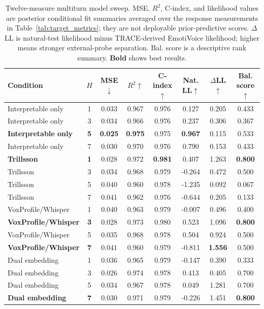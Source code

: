 \documentclass[conference]{IEEEtran}
\begin{document}
\begin{table}[t]
\centering
\caption{Twelve-measure multiturn model sweep. MSE, $R^2$, C-index, and likelihood values are posterior conditional fit summaries averaged over the response measurements in Table~\ref{tab:target_metrics}; they are not deployable prior-predictive scores. $\Delta$LL is natural-test likelihood minus TRACE-derived EmotiVoice likelihood; higher means stronger external-probe separation. Bal. score is a descriptive rank summary. \textbf{Bold} shows best results.%
}
\label{tab:clean_sweep}
\scriptsize
\setlength{\tabcolsep}{2.8pt}
\begin{tabular}{lccccccc}
\toprule
Condition & $H$ & MSE$\downarrow$ & $R^2$$\uparrow$ & C-index$\uparrow$ & Nat. LL$\uparrow$ & $\Delta$LL$\uparrow$ & Bal. score$\uparrow$ \\
\midrule
Interpretable only & 1 & 0.033 & 0.967 & 0.976 & 0.127 & 0.205 & 0.433 \\
Interpretable only & 3 & 0.034 & 0.966 & 0.976 & 0.237 & 0.306 & 0.367 \\
\textbf{Interpretable only} & \textbf{5} & \textbf{0.025} & \textbf{0.975} & 0.975 & \textbf{0.967} & 0.115 & 0.533 \\
Interpretable only & 7 & 0.030 & 0.970 & 0.976 & 0.790 & 0.153 & 0.433 \\
\midrule
\textbf{Trillsson} & \textbf{1} & 0.028 & 0.972 & \textbf{0.981} & 0.407 & 1.263 & \textbf{0.800} \\
Trillsson & 3 & 0.034 & 0.968 & 0.979 & -0.264 & 0.472 & 0.500 \\
Trillsson & 5 & 0.040 & 0.960 & 0.978 & -1.235 & 0.092 & 0.067 \\
Trillsson & 7 & 0.041 & 0.962 & 0.976 & -0.644 & 0.205 & 0.133 \\
\midrule
VoxProfile/Whisper & 1 & 0.040 & 0.963 & 0.979 & -0.007 & 0.496 & 0.400 \\
\textbf{VoxProfile/Whisper} & \textbf{3} & 0.028 & 0.973 & 0.980 & 0.523 & 1.096 & \textbf{0.800} \\
VoxProfile/Whisper & 5 & 0.035 & 0.968 & 0.978 & 0.504 & 0.924 & 0.500 \\
\textbf{VoxProfile/Whisper} & \textbf{7} & 0.041 & 0.960 & 0.979 & -0.811 & \textbf{1.556} & 0.500 \\
\midrule
Dual embedding & 1 & 0.036 & 0.965 & 0.979 & -0.147 & 0.390 & 0.333 \\
Dual embedding & 3 & 0.026 & 0.974 & 0.978 & 0.413 & 0.405 & 0.700 \\
Dual embedding & 5 & 0.034 & 0.967 & 0.978 & 0.049 & 1.281 & 0.700 \\
\textbf{Dual embedding} & \textbf{7} & 0.030 & 0.971 & 0.979 & -0.226 & 1.451 & \textbf{0.800} \\
\bottomrule
\end{tabular}
\end{table}
\end{document}
